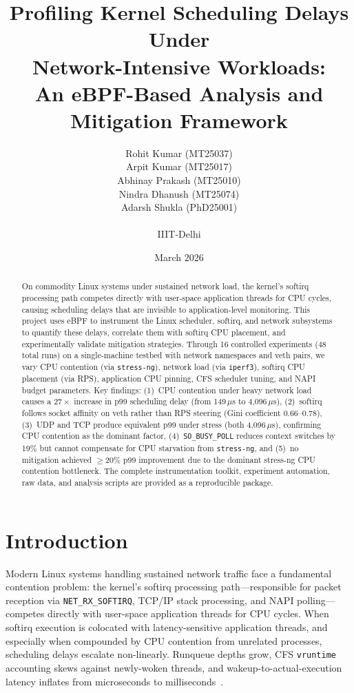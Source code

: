 \documentclass[11pt,a4paper]{article}
\title{
  \textbf{Profiling Kernel Scheduling Delays Under\\Network-Intensive Workloads:}\\[0.3em]
  \Large An eBPF-Based Analysis and Mitigation Framework
}
\author{
  Rohit Kumar (MT25037)\\
  Arpit Kumar (MT25017)\\
  Abhinay Prakash (MT25010)\\
  Nindra Dhanush (MT25074)\\
  Adarsh Shukla (PhD25001)\\
  \\
  IIIT-Delhi
}
\date{March 2026}
\begin{document}
\maketitle
\thispagestyle{empty}

\begin{abstract}
On commodity Linux systems under sustained network load, the kernel's softirq processing path competes directly with user-space application threads for CPU cycles, causing scheduling delays that are invisible to application-level monitoring. This project uses eBPF to instrument the Linux scheduler, softirq, and network subsystems to quantify these delays, correlate them with softirq CPU placement, and experimentally validate mitigation strategies. Through 16 controlled experiments (48 total runs) on a single-machine testbed with network namespaces and veth pairs, we vary CPU contention (via \texttt{stress-ng}), network load (via \texttt{iperf3}), softirq CPU placement (via RPS), application CPU pinning, CFS scheduler tuning, and NAPI budget parameters. Key findings: (1)~CPU contention under heavy network load causes a $27\times$ increase in p99 scheduling delay (from 149\,$\mu$s to 4,096\,$\mu$s), (2)~softirq follows socket affinity on veth rather than RPS steering (Gini coefficient 0.66--0.78), (3)~UDP and TCP produce equivalent p99 under stress (both 4,096\,$\mu$s), confirming CPU contention as the dominant factor, (4)~\texttt{SO\_BUSY\_POLL} reduces context switches by 19\% but cannot compensate for CPU starvation from \texttt{stress-ng}, and (5)~no mitigation achieved $\geq$20\% p99 improvement due to the dominant stress-ng CPU contention bottleneck. The complete instrumentation toolkit, experiment automation, raw data, and analysis scripts are provided as a reproducible package.
\end{abstract}

\tableofcontents
\newpage

\section{Introduction}
\label{sec:intro}

Modern Linux systems handling sustained network traffic face a fundamental contention problem: the kernel's softirq processing path---responsible for packet reception via \texttt{NET\_RX\_SOFTIRQ}, TCP/IP stack processing, and NAPI polling---competes directly with user-space application threads for CPU cycles. When softirq execution is colocated with latency-sensitive application threads, and especially when compounded by CPU contention from unrelated processes, scheduling delays escalate non-linearly. Runqueue depths grow, CFS \texttt{vruntime} accounting skews against newly-woken threads, and wakeup-to-actual-execution latency inflates from microseconds to milliseconds~\cite{dean2013tail}.
\end{document}
